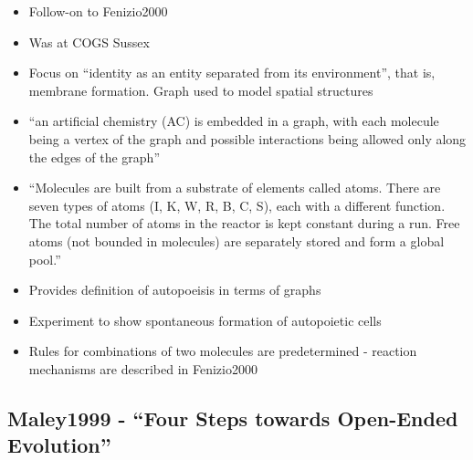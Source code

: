 		\begin{itemize}
			\item
			
			Follow-on to Fenizio2000
			
			\item
			
			Was at COGS Sussex
			
			\item
			
			Focus on ``identity as an entity separated from its environment'',
			that is, membrane formation. Graph used to model spatial structures
			
			\item
			
			``an artificial chemistry (AC) is embedded in a graph, with each
			molecule being a vertex of the graph and possible interactions being
			allowed only along the edges of the graph''
			
			\item
			
			``Molecules are built from a substrate of elements called atoms. There
			are seven types of atoms (I, K, W, R, B, C, S), each with a different
			function. The total number of atoms in the reactor is kept constant
			during a run. Free atoms (not bounded in molecules) are separately
			stored and form a global pool.''
			
			\item
			
			Provides definition of autopoeisis in terms of graphs
			
			\item
			
			Experiment to show spontaneous formation of autopoietic cells
			
			\item
			
			Rules for combinations of two molecules are predetermined - reaction
			mechanisms are described in Fenizio2000
			
		\end{itemize}
		
		\hypertarget{maley1999---four-steps-towards-open-ended-evolution}{\subsection{Maley1999
				- ``Four Steps towards Open-Ended
				Evolution''}\label{maley1999---four-steps-towards-open-ended-evolution}}
		
